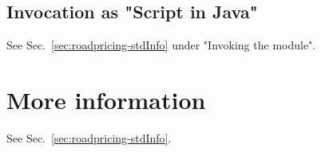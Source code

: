 \subsection{Invocation as "Script in Java"}

See Sec.~\ref{sec:roadpricing-stdInfo} under "Invoking the module".

	




\section{More information}

See Sec.~\ref{sec:roadpricing-stdInfo}.


